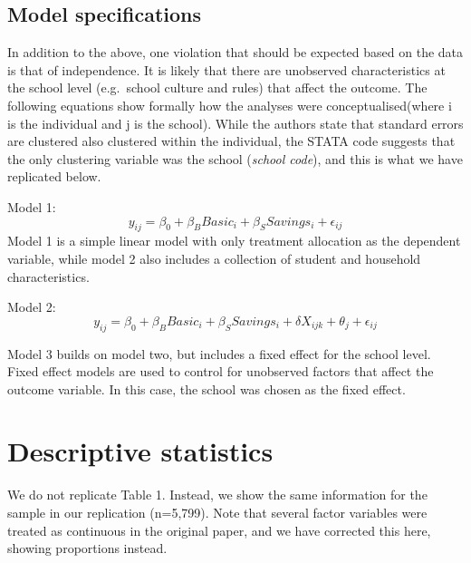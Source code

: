 \documentclass[
]{article}
\begin{document}
\hypertarget{model-specifications}{%
\subsection{Model specifications}\label{model-specifications}}

In addition to the above, one violation that should be expected based on
the data is that of independence. It is likely that there are unobserved
characteristics at the school level (e.g.~school culture and rules) that
affect the outcome. The following equations show formally how the
analyses were conceptualised(where i is the individual and j is the
school). While the authors state that standard errors are clustered also
clustered within the individual, the STATA code suggests that the only
clustering variable was the school (\emph{school code}), and this is
what we have replicated below.

Model 1:
\[ y_{ij} = \beta_0 + \beta_{B} Basic_i + \beta_{S} Savings_i + \epsilon_{ij} \]
Model 1 is a simple linear model with only treatment allocation as the
dependent variable, while model 2 also includes a collection of student
and household characteristics.

Model 2:
\[ y_{ij} = \beta_0 + \beta_{B} Basic_i + \beta_{S} Savings_i + \delta X_{ijk} + \theta_{j} + \epsilon_{ij} \]

Model 3 builds on model two, but includes a fixed effect for the school
level. Fixed effect models are used to control for unobserved factors
that affect the outcome variable. In this case, the school was chosen as
the fixed effect.

\hypertarget{descriptive-statistics}{%
\section{Descriptive statistics}\label{descriptive-statistics}}

We do not replicate Table 1. Instead, we show the same information for
the sample in our replication (n=5,799). Note that several factor
variables were treated as continuous in the original paper, and we have
corrected this here, showing proportions instead.
\end{document}
